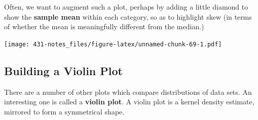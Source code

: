 \documentclass[
]{book}
\newenvironment{Shaded}{\begin{snugshade}}{\end{snugshade}}
\newcommand{\DataTypeTok}[1]{\textcolor[rgb]{0.13,0.29,0.53}{#1}}
\newcommand{\DecValTok}[1]{\textcolor[rgb]{0.00,0.00,0.81}{#1}}
\newcommand{\KeywordTok}[1]{\textcolor[rgb]{0.13,0.29,0.53}{\textbf{#1}}}
\newcommand{\NormalTok}[1]{#1}
\newcommand{\OperatorTok}[1]{\textcolor[rgb]{0.81,0.36,0.00}{\textbf{#1}}}
\newcommand{\OtherTok}[1]{\textcolor[rgb]{0.56,0.35,0.01}{#1}}
\newcommand{\StringTok}[1]{\textcolor[rgb]{0.31,0.60,0.02}{#1}}
\begin{document}
Often, we want to augment such a plot, perhaps by adding a little diamond to show the \textbf{sample mean} within each category, so as to highlight skew (in terms of whether the mean is meaningfully different from the median.)

\begin{Shaded}
\end{Shaded}

\texttt{[image: 431-notes\_files/figure-latex/unnamed-chunk-69-1.pdf]}

\hypertarget{building-a-violin-plot}{%
\subsection{Building a Violin Plot}\label{building-a-violin-plot}}

There are a number of other plots which compare distributions of data sets. An interesting one is called a \textbf{violin plot}. A violin plot is a kernel density estimate, mirrored to form a symmetrical shape.
\end{document}

